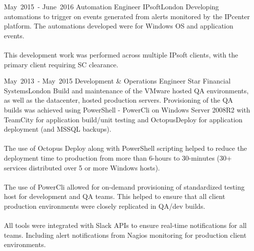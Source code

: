\cventry %
  {\mbox{May 2015 -} \mbox{June 2016}}
  {Automation Engineer}
  {IPsoft}{London}{}
  {
    Developing automations to trigger on events generated from alerts monitored by the IPcenter platform. 
    The automations developed were for Windows OS and application events.\\~\\
    This development work was performed across multiple IPsoft clients, with the primary client requiring SC clearance.\\ 
  }

\cventry %
  {\mbox{May 2013 -} \mbox{May 2015}}
  {Development \& Operations Engineer}
  {Star Financial Systems}{London}{}
  {
    Build and maintenance of the VMware hosted QA environments, as well as the datacenter, 
    hosted production servers. Provisioning of the QA builds was achieved using PowerShell - PowerCli 
    on Windows Server 2008R2 with TeamCity for application build/unit testing and OctopusDeploy 
    for application deployment (and MSSQL backups).\\~\\
    The use of Octopus Deploy along with PowerShell scripting helped to reduce the deployment time 
    to production from more than 6-hours to 30-minutes (30+ services distributed over 5 or more Windows hosts).\\~\\
    The use of PowerCli allowed for on-demand provisioning of standardized testing host for development and QA teams. 
    This helped to ensure that all client production environments were closely replicated in QA/dev builds.\\~\\
    All tools were integrated with Slack APIs to ensure real-time notifications for all teams.
    Including alert notifications from Nagios monitoring for production client environments.\\
  }

